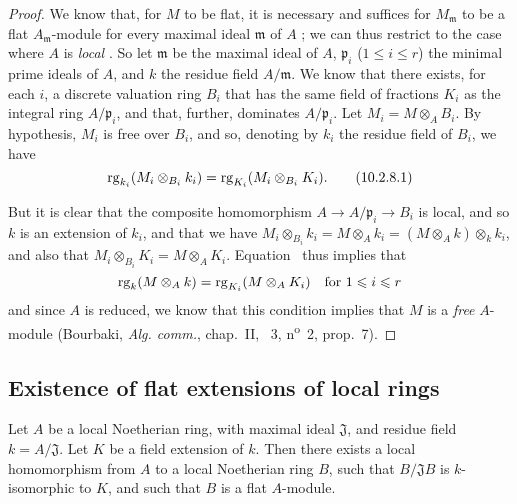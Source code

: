 \begin{proof}
We know that, for $M$ to be flat, it is necessary and suffices for $M_\mathfrak{m}$ to be a flat $A_\mathfrak{m}$-module for every maximal ideal $\mathfrak{m}$ of $A$ ;
we can thus restrict to the case where $A$ is \emph{local} .
So let $\mathfrak{m}$ be the maximal ideal of $A$, $\mathfrak{p}_i$ ($1\leq i\leq r$) the minimal prime ideals of $A$, and $k$ the residue field $A/\mathfrak{m}$.
We know  that there exists, for each $i$, a discrete valuation ring $B_i$ that has the same field of fractions $K_i$ as the integral ring $A/\mathfrak{p}_i$, and that, further, dominates $A/\mathfrak{p}_i$.
Let $M_i=M\otimes_A B_i$.
By hypothesis, $M_i$ is free over $B_i$, and so, denoting by $k_i$ the residue field of $B_i$, we have
\[
\label{0.10.2.8.1}
  \operatorname{rg}_{k_i}(M_i\otimes_{B_i}k_i)=\operatorname{rg}_{K_i}(M_i\otimes_{B_i}K_i).
  \tag{10.2.8.1}
\]

But it is clear that the composite homomorphism $A\to A/\mathfrak{p}_i\to B_i$ is local, and so $k$ is an extension of $k_i$, and that we have $M_i\otimes_{B_i}k_i = M\otimes_A k_i = (M\otimes_A k)\otimes_k k_i$, and also that $M_i\otimes_{B_i}K_i = M\otimes_A K_i$.
Equation~ thus implies that
\[
  \operatorname{rg}_k(M\otimes_A k)=\operatorname{rg}_{K_i}(M\otimes_A K_i)\quad\mbox{for $1\leqslant i\leqslant r$}
\]
and since $A$ is reduced, we know that this condition implies that $M$ is a \emph{free} $A$-module (Bourbaki, \emph{Alg. comm.}, chap.~II, \textsection~3, n\textsuperscript{o}~2, prop.~7).
\end{proof}

\subsection{Existence of flat extensions of local rings}
\label{subsection:0.10.3}

\begin{proposition}[10.3.1]
\label{0.10.3.1}
Let $A$ be a local Noetherian ring, with maximal ideal $\mathfrak{J}$, and residue field $k=A/\mathfrak{J}$.
Let $K$ be a field extension of $k$.
Then there exists a local homomorphism from $A$ to a local Noetherian ring $B$, such that $B/\mathfrak{J}B$ is $k$-isomorphic to $K$, and such that $B$ is a flat $A$-module.
\end{proposition}

